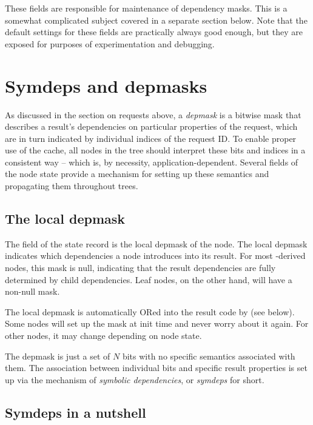 \documentclass[10pt,twoside]{book}
\begin{document}
  These fields are responsible for maintenance of dependency masks. This is a
  somewhat complicated subject covered in a separate section below. Note that
  the default settings for these fields are practically always good enough, but
  they are exposed for purposes of experimentation and debugging.

\chapter{Symdeps and depmasks}

  As discussed in the section on requests above, a {\em depmask} is a bitwise
  mask that describes a result's dependencies on particular properties of the
  request, which are in turn indicated by individual indices of the request ID.
  To enable proper use of the cache, all nodes in the tree should interpret
  these bits and indices in a consistent way -- which is, by necessity,
  application-dependent. Several fields of the node state provide a mechanism
  for setting up these semantics and propagating them throughout trees. 

\section{The local depmask}
  
  The  field of the state record is the local depmask of the
  node. The local depmask indicates which dependencies a node introduces into
  its result. For most -derived nodes, this mask is null,
  indicating that the result dependencies are fully determined by child
  dependencies. Leaf nodes, on the other hand, will have a non-null mask.

  The local depmask is automatically ORed into the result code by
   (see below). Some nodes will set up the mask at init
  time and never worry about it again. For other nodes, it may change depending
  on node state.

  The depmask is just a set of $N$ bits with no specific semantics associated
  with them. The association between individual bits and specific result
  properties is set up via the mechanism of {\em symbolic dependencies}, or
  {\em symdeps} for short.
  
\section{Symdeps in a nutshell}
  
\end{document}
